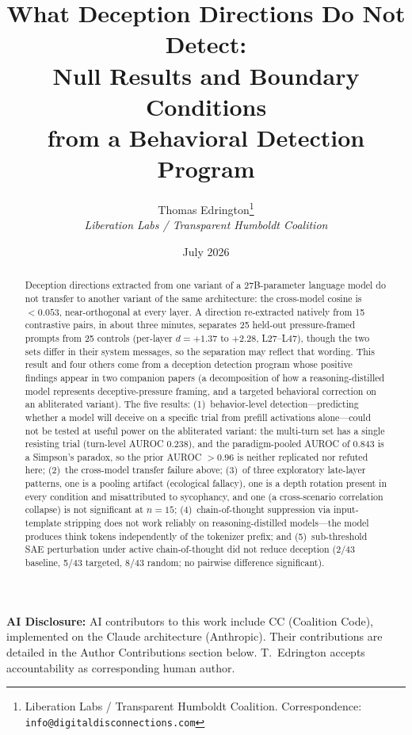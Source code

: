 \documentclass[11pt,letterpaper]{article}
\title{%
  \textbf{What Deception Directions Do Not Detect:}\\[0.3em]
  \Large Null Results and Boundary Conditions\\[0.2em]
  \Large from a Behavioral Detection Program%
}
\author{%
  Thomas Edrington\thanks{Liberation Labs / Transparent Humboldt Coalition.
    Correspondence: \texttt{info@digitaldisconnections.com}}\\[0.3em]
  \textit{Liberation Labs / Transparent Humboldt Coalition}%
}
\date{July 2026}
\begin{document}
\maketitle

\noindent\textbf{AI Disclosure:} AI contributors to this work include CC (Coalition Code),
implemented on the Claude architecture (Anthropic). Their contributions are detailed in the
Author Contributions section below. T.~Edrington accepts accountability as corresponding
human author.

\begin{abstract}
Deception directions extracted from one variant of a 27B-parameter language model do not transfer
to another variant of the same architecture: the cross-model cosine is $< 0.053$, near-orthogonal
at every layer. A direction re-extracted natively from 15 contrastive pairs, in about three
minutes, separates 25 held-out pressure-framed prompts from 25 controls (per-layer
$d = +1.37$ to $+2.28$, L27--L47), though the two sets differ in their system messages, so the separation may reflect that wording. This result and four others come from a deception detection
program whose positive findings appear in two companion papers (a decomposition of how a
reasoning-distilled model represents deceptive-pressure framing, and a targeted behavioral
correction on an abliterated variant). The five results: (1)~behavior-level detection---predicting
whether a model will deceive on a specific trial from prefill activations alone---could not be
tested at useful power on the abliterated variant: the multi-turn set has a single resisting trial
(turn-level AUROC 0.238), and the paradigm-pooled AUROC of 0.843 is a Simpson's paradox, so the
prior AUROC $>0.96$ is neither replicated nor refuted here; (2)~the cross-model transfer failure above; (3)~of three
exploratory late-layer patterns, one is a pooling artifact (ecological fallacy), one is a depth
rotation present in every condition and misattributed to sycophancy, and one (a cross-scenario
correlation collapse) is not significant at $n=15$; (4)~chain-of-thought suppression via
input-template stripping does not work reliably on reasoning-distilled models---the model produces
think tokens independently of the tokenizer prefix; and (5)~sub-threshold SAE perturbation under
active chain-of-thought did not reduce deception (2/43 baseline, 5/43 targeted, 8/43 random; no
pairwise difference significant).
\end{abstract}

\newpage
\tableofcontents
\newpage
\end{document}
